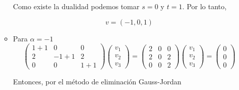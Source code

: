 \begin{enumerate}
\begin{itemize}
	    Como existe la dualidad podemos tomar $s=0$ y $t=1$. Por lo tanto,
	    \begin{tcolorbox}
		\begin{equation}
		    v=(-1,0,1)
		\end{equation}
	    \end{tcolorbox}
	    \vspace{.6cm}

	\item Para $\alpha=-1$
	    $$
	    \left(\begin{array}{*{3}{c}}
		1+1 & 0 & 0\\
		2 & -1+1 & 2 \\
		0 & 0 & 1+1
	    \end{array}\right)  
	    \left(\begin{array}{c}
		v_1 \\
		v_2 \\
		v_3
	    \end{array}\right) = 
	    \left(\begin{array}{*{3}{c}}
		2 & 0 & 0 \\
		2 & 0 & 2 \\
		0 & 0 & 2
	    \end{array}\right)
	    \left(\begin{array}{c}
		v_1 \\
		v_2 \\
		v_3
	    \end{array}\right) = 
	    \left(\begin{array}{c}
		0 \\
		0 \\
		0	
	    \end{array}\right)
	    $$

	    Entonces, por el método de eliminación Gauss-Jordan


\end{itemize}
\end{enumerate}
